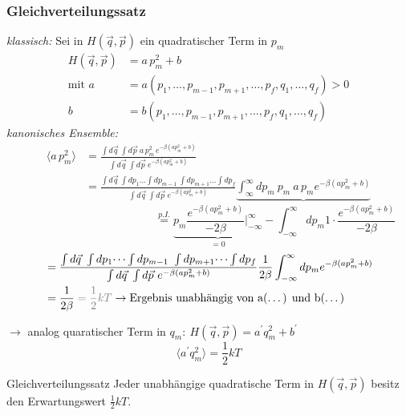 \subsubsection{Gleichverteilungssatz} 
\emph{klassisch:} Sei in $H(\Vec{q},\Vec{p})$ ein quadratischer Term in $p_m$
\begin{align}
    H(\Vec{q},\Vec{p}) &= a \, p_m^2 + b \\
    \text{mit } a &= a(p_1, \dots, p_{m-1}, p_{m+1}, \dots, p_f,q_1,\dots, q_f) > 0 \\
    b &= b(p_1, \dots, p_{m-1}, p_{m+1}, \dots, p_f,q_1,\dots, q_f)
\end{align}
\emph{kanonisches Ensemble:}
\begin{align}
    \langle a \, p_m^2 \rangle &= \frac{\int d\Vec{q} \ \int d\Vec{p} \ a \, p_m^2 \, e^{-\beta(a p_m^2+b)}}{\int d\Vec{q} \ \int d\Vec{p} \ e^{-\beta(a p_m^2+b)}} \\
    &= \frac{\int d\Vec{q} \ \int dp_1 \dots \int dp_{m-1} \ \int dp_{m+1} \dots \int dp_f}{\int d\Vec{q} \ \int d\Vec{p} \ e^{-\beta(a p_m^2+b)}} \underbrace{\int_{\infty}^{\infty} dp_m \ p_m \ a \, p_m e^{-\beta(a p_m^2+b)}}
\end{align}
\begin{equation}
    \hspace{5cm} \stackrel{p.I.}{=} \underbrace{p_m \frac{e^{-\beta(a p_m^2 + b)}}{- 2 \beta}\Big|_{-\infty}^{\infty}}_{= 0} - \int_{-\infty}^{\infty} dp_m 1 \cdot \frac{e^{-\beta(a p_m^2 + b)}}{- 2 \beta}
\end{equation}
\begin{align}
   &= \frac{\int d\Vec{q} \ \int dp_1 \dots \int dp_{m-1} \ \int dp_{m+1} \dots \int dp_f}{\int d\Vec{q} \ \int d\Vec{p} \ e^{-\beta(a p_m^2+b)}} \frac{1}{2 \beta} \int_{-\infty}^{\infty} dp_m e^{-\beta(a p_m^2 + b)} \\
   &= \frac{1}{2 \beta} \color{black!50!white} = \frac{1}{2} k T \color{black} \rightarrow \text{Ergebnis unabhängig von a(\dots) und b(\dots)}
\end{align}

$\longrightarrow$ analog quaratischer Term in $q_m: \ H(\Vec{q},\Vec{p}) = a^{\prime} q_m^2 + b^{\prime}$
\begin{equation}
    \langle a^{\prime} q_m^2 \rangle = \frac{1}{2} k T
\end{equation}

\begin{definition}{Gleichverteilungssatz}
    Jeder unabhängige quadratische Term in $H(\Vec{q},\Vec{p})$ besitz den Erwartungswert $\frac{1}{2} k T$.
\end{definition}

